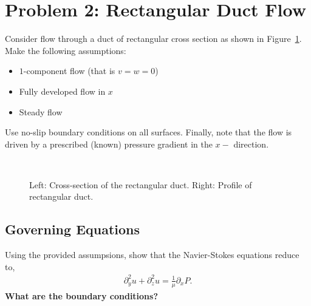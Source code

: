 \documentclass[11pt]{article}
\begin{document}


\newpage
    \section{Problem 2:  Rectangular Duct Flow}
    Consider flow through a duct of rectangular cross section as shown in Figure~\ref{fig:rect_duct}.  Make the following
assumptions:
    \begin{itemize}
      \item $1$-component flow (that is $v = w = 0$)
      \item Fully developed flow in $x$
      \item Steady flow
    \end{itemize}
    Use no-slip boundary conditions on all surfaces.  Finally, note that the flow is driven by a prescribed (known) pressure
gradient in the $x-$ direction.

    \begin{figure}[h!]
      \centering
      ~~~
      \caption{Left:  Cross-section of the rectangular duct. Right: Profile of rectangular duct.}
      \label{fig:rect_duct}
    \end{figure}

    \subsection{Governing Equations}
    Using the provided assumpsions, show that the Navier-Stokes equations reduce to, 
    \begin{align}
      \partial_{y}^{2}u + \partial_{z}^{2}u = \frac{1}{\mu}\partial_{x}P.
    \end{align}
    \textbf{What are the boundary conditions?}
\end{document}
